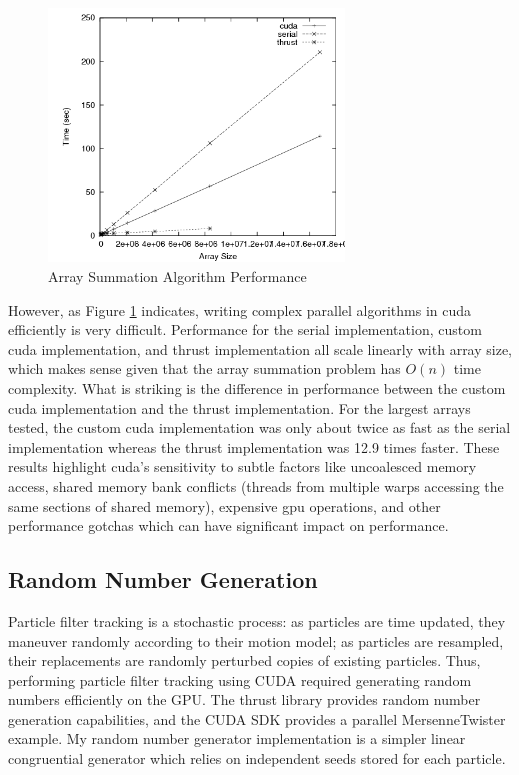 \documentclass{article}
\begin{document}
\begin{figure}
\centering
\includegraphics[width=0.7\textwidth]{data/summation_plot.png}
\caption{Array Summation Algorithm Performance}
\label{summation_plot}
\end{figure}

However, as Figure \ref{summation_plot} indicates, writing complex parallel algorithms in cuda efficiently is very difficult. Performance for the serial implementation, custom cuda implementation, and thrust implementation all scale linearly with array size, which makes sense given that the array summation problem has \(O(n)\) time complexity. What is striking is the difference in performance between the custom cuda implementation and the thrust implementation. For the largest arrays tested, the custom cuda implementation was only about twice as fast as the serial implementation whereas the thrust implementation was 12.9 times faster. These results highlight cuda's sensitivity to subtle factors like uncoalesced memory access, shared memory bank conflicts (threads from multiple warps accessing the same sections of shared memory), expensive gpu operations, and other performance gotchas which can have significant impact on performance\cite{bestprac}.

\subsection{Random Number Generation}
Particle filter tracking is a stochastic process: as particles are time updated, they maneuver randomly according to their motion model; as particles are resampled, their replacements are randomly perturbed copies of existing particles. Thus, performing particle filter tracking using CUDA required generating random numbers efficiently on the GPU. The thrust library provides random number generation capabilities, and the CUDA SDK provides a parallel MersenneTwister example. My random number generator implementation is a simpler linear congruential generator which relies on independent seeds stored for each particle.
\end{document}
